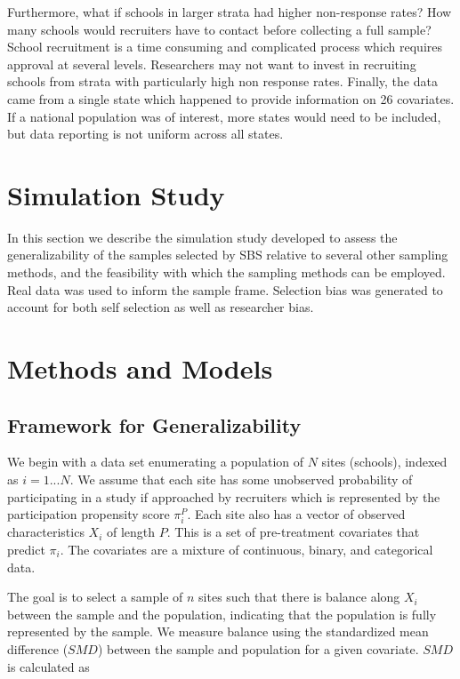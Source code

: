 \documentclass[man,floatsintext]{apa6}
\begin{document}
Furthermore, what if schools in larger strata had higher non-response rates? How many schools would recruiters have to contact before collecting a full sample? School recruitment is a time consuming and complicated process which requires approval at several levels. Researchers may not want to invest in recruiting schools from strata with particularly high non response rates. Finally, the data came from a single state which happened to provide information on 26 covariates. If a national population was of interest, more states would need to be included, but data reporting is not uniform across all states.

\hypertarget{simulation-study}{%
\section{Simulation Study}\label{simulation-study}}

In this section we describe the simulation study developed to assess the generalizability of the samples selected by SBS relative to several other sampling methods, and the feasibility with which the sampling methods can be employed. Real data was used to inform the sample frame.
Selection bias was generated to account for both self selection as well as researcher bias.

\hypertarget{methods-and-models}{%
\section{Methods and Models}\label{methods-and-models}}

\hypertarget{framework-for-generalizability}{%
\subsection{Framework for Generalizability}\label{framework-for-generalizability}}

We begin with a data set enumerating a population of \(N\) sites (schools), indexed as \(i = 1 ... N\). We assume that each site has some unobserved probability of participating in a study if approached by recruiters which is represented by the participation propensity score \(\pi_i^P\). Each site also has a vector of observed characteristics \(X_i\) of length \(P\). This is a set of pre-treatment covariates that predict \(\pi_i\). The covariates are a mixture of continuous, binary, and categorical data.

The goal is to select a sample of \(n\) sites such that there is balance along \(X_i\) between the sample and the population, indicating that the population is fully represented by the sample. We measure balance using the standardized mean difference (\(SMD\)) between the sample and population for a given covariate. \(SMD\) is calculated as
\end{document}
